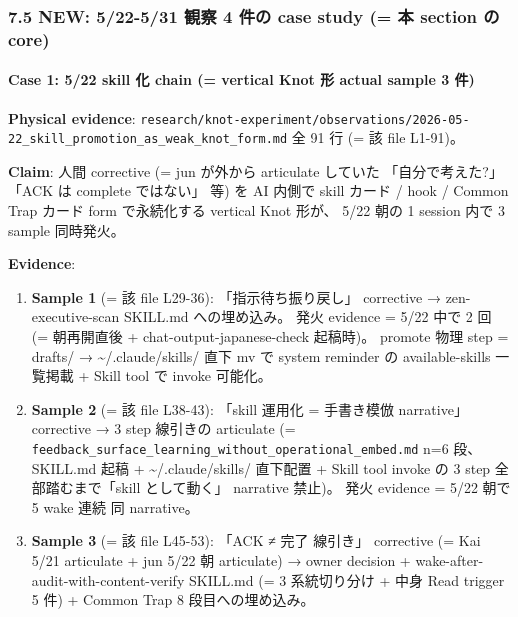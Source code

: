 \documentclass[
]{article}
\providecommand{\tightlist}{%
  \setlength{\itemsep}{0pt}\setlength{\parskip}{0pt}}
\begin{document}
\subsubsection{7.5 NEW: 5/22-5/31 観察 4 件の case study (= 本 section
の
core)}\label{new-522-531-ux89b3ux5bdf-4-ux4ef6ux306e-case-study-ux672c-section-ux306e-core}

\paragraph{Case 1: 5/22 skill 化 chain (= vertical Knot 形 actual sample
3
件)}\label{case-1-522-skill-ux5316-chain-vertical-knot-ux5f62-actual-sample-3-ux4ef6}

\textbf{Physical evidence}:
\texttt{research/knot-experiment/observations/2026-05-22\_skill\_promotion\_as\_weak\_knot\_form.md}
全 91 行 (= 該 file L1-91)。

\textbf{Claim}: 人間 corrective (= jun が外から articulate していた
「自分で考えた?」 「ACK は complete ではない」 等) を AI 内側で skill
カード / hook / Common Trap カード form で永続化する vertical Knot
形が、 5/22 朝の 1 session 内で 3 sample 同時発火。

\textbf{Evidence}:

\begin{enumerate}
\def\labelenumi{\arabic{enumi}.}
\tightlist
\item
  \textbf{Sample 1} (= 該 file L29-36): 「指示待ち振り戻し」 corrective
  → zen-executive-scan SKILL.md への埋め込み。 発火 evidence = 5/22 中で
  2 回 (= 朝再開直後 + chat-output-japanese-check 起稿時)。 promote 物理
  step = drafts/ → \textasciitilde/.claude/skills/ 直下 mv で system
  reminder の available-skills 一覧掲載 + Skill tool で invoke 可能化。
\item
  \textbf{Sample 2} (= 該 file L38-43): 「skill 運用化 = 手書き模倣
  narrative」 corrective → 3 step 線引きの articulate (=
  \texttt{feedback\_surface\_learning\_without\_operational\_embed.md}
  n=6 段、 SKILL.md 起稿 + \textasciitilde/.claude/skills/ 直下配置 +
  Skill tool invoke の 3 step 全部踏むまで「skill として動く」 narrative
  禁止)。 発火 evidence = 5/22 朝で 5 wake 連続 同 narrative。
\item
  \textbf{Sample 3} (= 該 file L45-53): 「ACK ≠ 完了 線引き」 corrective
  (= Kai 5/21 articulate + jun 5/22 朝 articulate) → owner decision +
  wake-after-audit-with-content-verify SKILL.md (= 3 系統切り分け + 中身
  Read trigger 5 件) + Common Trap 8 段目への埋め込み。
\end{enumerate}
\end{document}
